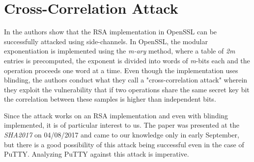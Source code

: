 \documentclass{bhamthesis}
\begin{document}
\section{Cross-Correlation Attack}
In \cite{vadnala} the authors show that the RSA implementation in OpenSSL can be successfully attacked using side-channels. In OpenSSL, the modular exponentiation is implemented using the \textit{m-ary} method, where a table of \textit{2m} entries is precomputed, the exponent is divided into words of \textit{m}-bits each and the operation proceeds one word at a time. Even though the implementation uses blinding, the authors conduct what they call a "cross-correlation attack" wherein they exploit the vulnerability that if two operations share the same secret key bit the correlation between these samples is higher than independent bits.\par
Since the attack works on an RSA implementation and even with blinding implemented, it is of particular interest to us. The paper was presented at the \textit{SHA2017} on 04/08/2017 and came to our knowledge only in early September, but there is a good possibility of this attack being successful even in the case of PuTTY. Analyzing PuTTY against this attack is imperative.
\end{document}
